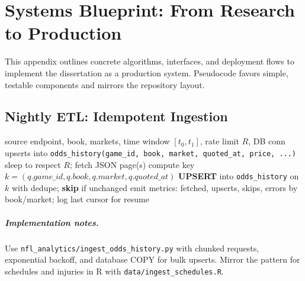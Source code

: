 \chapter[Systems Blueprint]{Systems Blueprint: From Research to Production}
\label{app:systems-blueprint}

\begingroup\sloppy

This appendix outlines concrete algorithms, interfaces, and deployment flows to implement the dissertation as a production system. Pseudocode favors simple, testable components and mirrors the repository layout.

\section{Nightly ETL: Idempotent Ingestion}
\begin{algorithm}[H]\small
  \caption{Idempotent Odds Ingestion (per book/market/date)}
  \label{alg:ingest-odds}
  \begin{algorithmic}[1]
    \Require source endpoint, book, markets, time window $[t_0,t_1]$, rate limit $R$, DB conn
    \Ensure upserts into \texttt{odds\_history(game\_id, book, market, quoted\_at, price, ...)}
      \State sleep to respect $R$; fetch JSON page(s)
        \State compute key $k=(q.game\_id,q.book,q.market,q.quoted\_at)$
        \State \textbf{UPSERT} into \texttt{odds\_history} on $k$ with dedupe; \textbf{skip} if unchanged
      \EndFor
    \EndFor
    \State emit metrics: {fetched, upserts, skips, errors} by book/market; log last cursor for resume
  \end{algorithmic}
\end{algorithm}

\endgroup

\paragraph{Implementation notes.} Use \texttt{nfl\_analytics/ingest\_odds\_history.py} with chunked requests, exponential backoff, and database COPY for bulk upserts. Mirror the pattern for schedules and injuries in R with \texttt{data/ingest\_schedules.R}.

